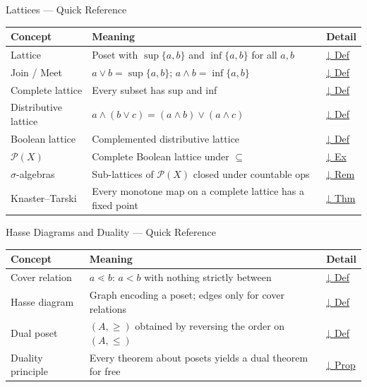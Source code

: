 \begin{toolkitbox}{Lattices — Quick Reference}
\small
\begin{tabular}{l l l}
\toprule
\textbf{Concept} & \textbf{Meaning} & \textbf{Detail} \\
\midrule
Lattice              & Poset with $\sup\{a,b\}$ and $\inf\{a,b\}$ for all $a,b$   & \hyperref[def:lattice]{↓ Def} \\
Join / Meet          & $a \vee b = \sup\{a,b\}$; $a \wedge b = \inf\{a,b\}$        & \hyperref[def:lattice]{↓ Def} \\
Complete lattice     & Every subset has sup and inf                                & \hyperref[def:complete-lattice]{↓ Def} \\
Distributive lattice & $a \wedge (b \vee c) = (a \wedge b) \vee (a \wedge c)$      & \hyperref[def:distributive-lattice]{↓ Def} \\
Boolean lattice      & Complemented distributive lattice                           & \hyperref[def:boolean-lattice]{↓ Def} \\
$\mathcal{P}(X)$     & Complete Boolean lattice under $\subseteq$                  & \hyperref[ex:power-set-lattice]{↓ Ex} \\
$\sigma$-algebras    & Sub-lattices of $\mathcal{P}(X)$ closed under countable ops  & \hyperref[rem:sigma-alg-lattice]{↓ Rem} \\
Knaster--Tarski      & Every monotone map on a complete lattice has a fixed point   & \hyperref[thm:knaster-tarski]{↓ Thm} \\
\bottomrule
\end{tabular}
\end{toolkitbox}



\begin{toolkitbox}{Hasse Diagrams and Duality — Quick Reference}
\small
\begin{tabular}{l l l}
\toprule
\textbf{Concept} & \textbf{Meaning} & \textbf{Detail} \\
\midrule
Cover relation    & $a \lessdot b$: $a < b$ with nothing strictly between       & \hyperref[def:cover-relation]{↓ Def} \\
Hasse diagram     & Graph encoding a poset; edges only for cover relations      & \hyperref[def:hasse]{↓ Def} \\
Dual poset        & $(A, \geq)$ obtained by reversing the order on $(A, \leq)$  & \hyperref[def:dual-poset]{↓ Def} \\
Duality principle & Every theorem about posets yields a dual theorem for free   & \hyperref[prop:order-duality]{↓ Prop} \\
\bottomrule
\end{tabular}
\end{toolkitbox}

